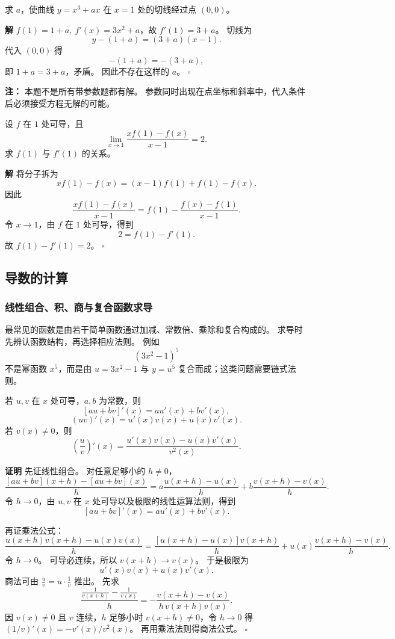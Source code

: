 \documentclass[fontset=fandol]{ctexart}
\newenvironment{proofdetail}{\par\noindent\textbf{证明}\quad}{\hfill$\square$\par\vspace{0.8em}}
\newenvironment{solution}{\par\noindent\textbf{解}\quad}{\hfill$\square$\par\vspace{0.8em}}
\newenvironment{warning}{\par\noindent\textbf{注：}\quad}{\par\vspace{0.8em}}
\begin{document}
\begin{example}[切线与参数]
求 $a$，使曲线 $y=x^3+ax$ 在 $x=1$ 处的切线经过点 $(0,0)$。
\end{example}
\begin{solution}
$f(1)=1+a,\ f'(x)=3x^2+a$，故 $f'(1)=3+a$。 切线为
\[
y-(1+a)=(3+a)(x-1).
\]
代入 $(0,0)$ 得
\[
-(1+a)=-(3+a),
\]
即 $1+a=3+a$，矛盾。 因此不存在这样的 $a$。
\end{solution}
\begin{warning}
本题不是所有带参数题都有解。 参数同时出现在点坐标和斜率中，代入条件后必须接受方程无解的可能。
\end{warning}

\begin{example}[由切线条件反求函数值]
设 $f$ 在 $1$ 处可导，且
\[
\lim_{x\to1}\frac{xf(1)-f(x)}{x-1}=2.
\]
求 $f(1)$ 与 $f'(1)$ 的关系。
\end{example}
\begin{solution}
将分子拆为
\[
xf(1)-f(x)=(x-1)f(1)+f(1)-f(x).
\]
因此
\[
\frac{xf(1)-f(x)}{x-1}
=f(1)-\frac{f(x)-f(1)}{x-1}.
\]
令 $x\to1$，由 $f$ 在 $1$ 处可导，得到
\[
2=f(1)-f'(1).
\]
故 $f(1)-f'(1)=2$。
\end{solution}

\subsection{导数的计算}


\subsubsection*{线性组合、积、商与复合函数求导}

最常见的函数是由若干简单函数通过加减、常数倍、乘除和复合构成的。 求导时先辨认函数结构，再选择相应法则。 例如
\[
(3x^2-1)^5
\]
不是幂函数 $x^5$，而是由 $u=3x^2-1$ 与 $y=u^5$ 复合而成；这类问题需要链式法则。

\begin{theorem}
若 $u,v$ 在 $x$ 处可导，$a,b$ 为常数，则
\[
[au+bv]'(x)=au'(x)+bv'(x),
\]
\[
(uv)'(x)=u'(x)v(x)+u(x)v'(x).
\]
若 $v(x)\neq0$，则
\[
\left(\frac{u}{v}\right)'(x)=\frac{u'(x)v(x)-u(x)v'(x)}{v^2(x)}.
\]
\end{theorem}
\begin{proofdetail}
先证线性组合。 对任意足够小的 $h\neq0$，
\[
\frac{[au+bv](x+h)-[au+bv](x)}{h}
=a\frac{u(x+h)-u(x)}{h}
+b\frac{v(x+h)-v(x)}{h}.
\]
令 $h\to0$，由 $u,v$ 在 $x$ 处可导以及极限的线性运算法则，得到
\[
[au+bv]'(x)=au'(x)+bv'(x).
\]

再证乘法公式：
\[
\frac{u(x+h)v(x+h)-u(x)v(x)}{h}
=\frac{[u(x+h)-u(x)]v(x+h)}{h}+u(x)\frac{v(x+h)-v(x)}{h}.
\]
令 $h\to0$。 可导必连续，所以 $v(x+h)\to v(x)$。 于是极限为
\[
u'(x)v(x)+u(x)v'(x).
\]
商法可由 $\frac{u}{v}=u\cdot\frac1v$ 推出。 先求
\[
\frac{\frac1{v(x+h)}-\frac1{v(x)}}{h}
=-\frac{v(x+h)-v(x)}{h\,v(x+h)v(x)}.
\]
因 $v(x)\neq0$ 且 $v$ 连续，$h$ 足够小时 $v(x+h)\neq0$，令 $h\to0$ 得 $(1/v)'(x)=-v'(x)/v^2(x)$。 再用乘法法则得商法公式。
\end{proofdetail}
\end{document}
